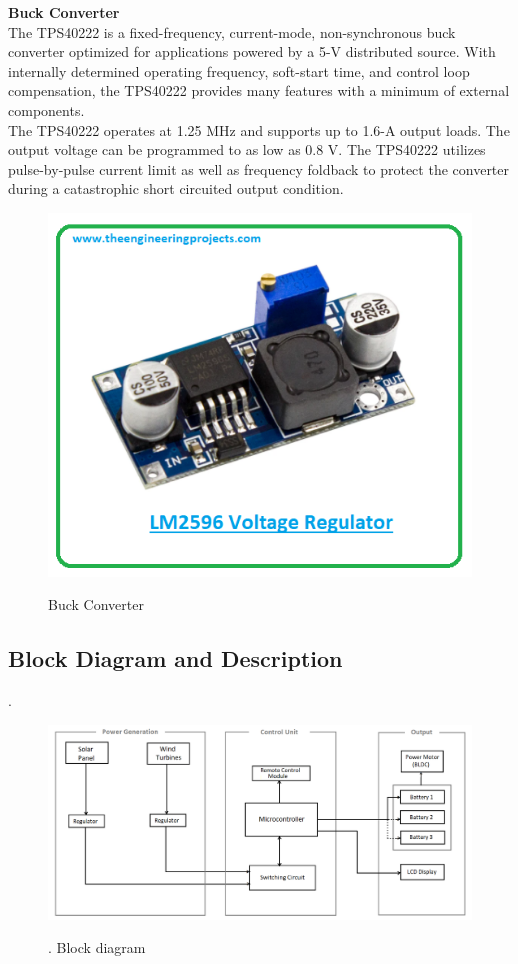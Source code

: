 \documentclass[a4paper,12pt]{article}
\begin{document}
\textbf{Buck Converter}\\[1cm]
The TPS40222 is a fixed-frequency, current-mode,
non-synchronous buck converter optimized for
applications powered by a 5-V distributed source.
With internally determined operating frequency,
soft-start time, and control loop compensation, the
TPS40222 provides many features with a minimum of
external components.\\
The TPS40222 operates at 1.25 MHz and supports
up to 1.6-A output loads. The output voltage can be
programmed to as low as 0.8 V. The TPS40222
utilizes pulse-by-pulse current limit as well as
frequency foldback to protect the converter during a
catastrophic short circuited output condition.\\

\begin{figure}[!h]
\centering
\includegraphics[scale=0.5]{bc.png}\\
\caption{Buck Converter}
\end{figure}

\newpage
\subsection{Block Diagram and Description}.
  \\[6cm]
\begin{figure}[!h]
\centering
\includegraphics[scale=0.2]{bd.png}\\
\caption{. Block diagram}
\end{figure}
\end{document}
